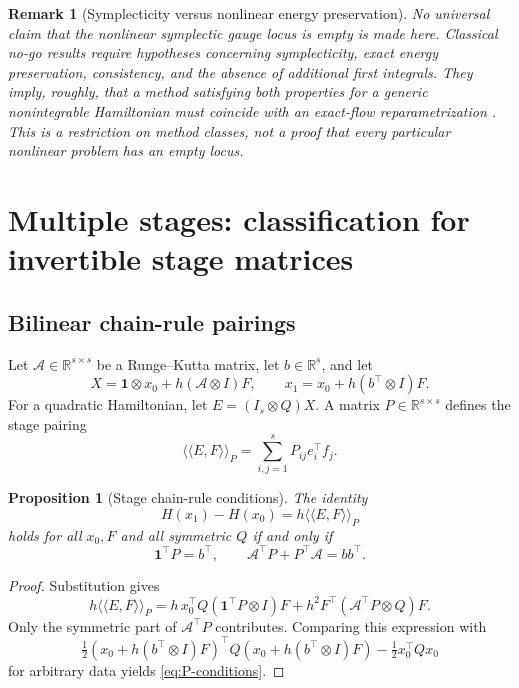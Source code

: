 \documentclass[11pt,a4paper]{article}
\newtheorem{proposition}[theorem]{Proposition}
\newtheorem{remark}[theorem]{Remark}
\newcommand{\R}{\mathbb R}
\newcommand{\one}{\bm 1}
\begin{document}
\begin{remark}[Symplecticity versus nonlinear energy preservation]
No universal claim that the nonlinear symplectic gauge locus is empty is
made here. Classical no-go results require hypotheses concerning
symplecticity, exact energy preservation, consistency, and the absence of
additional first integrals. They imply, roughly, that a method satisfying
both properties for a generic nonintegrable Hamiltonian must coincide with
an exact-flow reparametrization \cite{ge1988,hairer2006}. This is a
restriction on method classes, not a proof that every particular nonlinear
problem has an empty locus.
\end{remark}

\section{Multiple stages: classification for invertible stage matrices}

\subsection{Bilinear chain-rule pairings}

Let \(\mathcal A\in\R^{s\times s}\) be a Runge--Kutta matrix,
let \(b\in\R^s\), and let
\[
 X=\one\otimes x_0+h(\mathcal A\otimes I)F,
 \qquad
 x_1=x_0+h(b^\top\otimes I)F.
\]
For a quadratic Hamiltonian, let \(E=(I_s\otimes Q)X\). A matrix
\(P\in\R^{s\times s}\) defines the stage pairing
\[
 \langle\!\langle E,F\rangle\!\rangle_P
 =\sum_{i,j=1}^sP_{ij}e_i^\top f_j.
\]

\begin{proposition}[Stage chain-rule conditions]\label{prop:P-conditions}
The identity
\[
 H(x_1)-H(x_0)
 =h\langle\!\langle E,F\rangle\!\rangle_P
\]
holds for all \(x_0,F\) and all symmetric \(Q\) if and only if
\begin{equation}\label{eq:P-conditions}
 \boxed{\ \one^\top P=b^\top,\qquad
 \mathcal A^\top P+P^\top\mathcal A=bb^\top.\ }
\end{equation}
\end{proposition}

\begin{proof}
Substitution gives
\[
 h\langle\!\langle E,F\rangle\!\rangle_P
 =h\,x_0^\top Q(\one^\top P\otimes I)F
 +h^2F^\top(\mathcal A^\top P\otimes Q)F.
\]
Only the symmetric part of \(\mathcal A^\top P\) contributes. Comparing
this expression with
\[
 \tfrac12(x_0+h(b^\top\otimes I)F)^\top Q
 (x_0+h(b^\top\otimes I)F)-\tfrac12x_0^\top Qx_0
\]
for arbitrary data yields \cref{eq:P-conditions}.
\end{proof}
\end{document}
